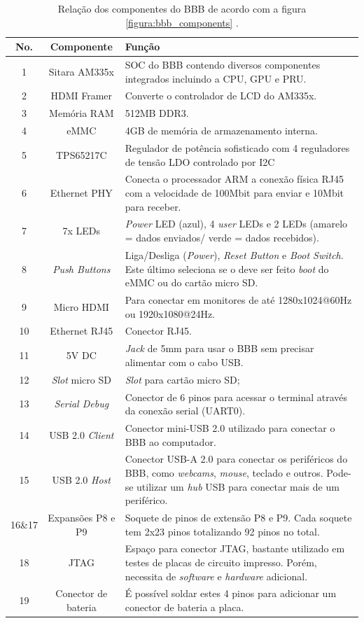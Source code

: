 \begin{table}[h]
	\centering
	\begin{tabular}[c]{ccm{10cm}}
		No.&Componente&Função\\ \hline
		1&Sitara AM335x&SOC do BBB contendo diversos componentes integrados incluindo a CPU, GPU e PRU.\\
		2&HDMI Framer&Converte o controlador de LCD do AM335x.\\
		3&Memória RAM&512MB DDR3.\\
		4&eMMC&4GB de memória de armazenamento interna.\\
		5&TPS65217C&Regulador de potência sofisticado com 4 reguladores de tensão LDO controlado por I2C\\
		6&Ethernet PHY&Conecta o processador ARM a conexão física RJ45 com a velocidade de 100Mbit para enviar e 10Mbit para receber.\\
		7&7x LEDs&\emph{Power} LED (azul), 4 \emph{user} LEDs e 2 LEDs (amarelo = dados enviados/ verde = dados recebidos).\\
		8&\emph{Push Buttons}&Liga/Desliga (\emph{Power}), \emph{Reset Button} e \emph{Boot Switch}. Este último seleciona se o deve ser feito \emph{boot} do eMMC ou do cartão micro SD.\\
		9&Micro HDMI&Para conectar em monitores de até 1280x1024@60Hz ou 1920x1080@24Hz.\\
		10&Ethernet RJ45&Conector RJ45.\\
		11&5V DC& \emph{Jack} de 5mm para usar o BBB sem precisar alimentar com o cabo USB.\\
		12&\emph{Slot} micro SD& \emph{Slot} para cartão micro SD;\\
		13&\emph{Serial Debug}&Conector de 6 pinos para acessar o terminal através da conexão serial (UART0).\\
		14&USB 2.0 \emph{Client}&Conector mini-USB 2.0 utilizado para conectar o BBB ao computador.\\
		15&USB 2.0 \emph{Host}&Conector USB-A 2.0 para conectar os periféricos do BBB, como \emph{webcams}, \emph{mouse}, teclado e outros. Pode-se utilizar um \emph{hub} USB para conectar mais de um periférico.\\
		16\&17&Expansões P8 e P9&Soquete de pinos de extensão P8 e P9. Cada soquete tem 2x23 pinos totalizando 92 pinos no total.\\
		18&JTAG&Espaço para conector JTAG, bastante utilizado em testes de placas de circuito impresso. Porém, necessita de \emph{software} e \emph{hardware} adicional.\\
		19&Conector de bateria&É possível soldar estes 4 pinos para adicionar um conector de bateria a placa.\\
		\hline
	\end{tabular}
	\caption{Relação dos componentes do BBB de acordo com a figura \ref{figura:bbb_components} \cite{derekbbb}.}
	\label{tab:bbb_components}
\end{table}

